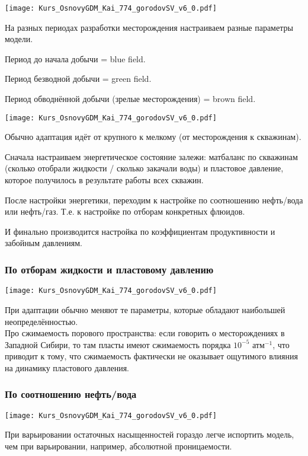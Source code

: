\documentclass[main.tex]{subfiles}
\begin{document}
\texttt{[image: Kurs\_OsnovyGDM\_Kai\_774\_gorodovSV\_v6\_0.pdf]}

На разных периодах разработки месторождения настраиваем разные параметры модели.

Период до начала добычи = blue field.

Период безводной добычи = green field.

Период обводнённой добычи (зрелые месторождения) = brown field.

\texttt{[image: Kurs\_OsnovyGDM\_Kai\_774\_gorodovSV\_v6\_0.pdf]}

Обычно адаптация идёт от крупного к мелкому (от месторождения к скважинам).

Сначала настраиваем энергетическое состояние залежи: матбаланс по скважинам (сколько отобрали жидкости / сколько закачали воды) и пластовое давление, которое получилось в результате работы всех скважин.

После настройки энергетики, переходим к настройке по соотношению нефть/вода или нефть/газ.
Т.е. к настройке по отборам конкретных флюидов.

И финально производится настройка по коэффициентам продуктивности и забойным давлениям.

\subsubsection{По отборам жидкости и пластовому давлению}

\texttt{[image: Kurs\_OsnovyGDM\_Kai\_774\_gorodovSV\_v6\_0.pdf]}

При адаптации обычно меняют те параметры, которые обладают наибольшей неопределённостью.
\\

Про сжимаемость порового пространства: если говорить о месторождениях в Западной Сибири, то там пласты имеют сжимаемость порядка $10^{-5} \text{ атм}^{-1}$, что приводит к тому, что сжимаемость фактически не оказывает ощутимого влияния на динамику пластового давления.

\subsubsection{По соотношению нефть/вода}

\texttt{[image: Kurs\_OsnovyGDM\_Kai\_774\_gorodovSV\_v6\_0.pdf]}

При варьировании остаточных насыщенностей гораздо легче испортить модель, чем при варьировании, например, абсолютной проницаемости.
\\
\end{document}
